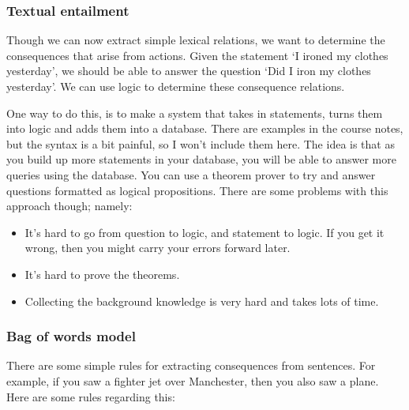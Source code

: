 \subsubsection{Textual entailment}

Though we can now extract simple lexical relations, we want to determine the
consequences that arise from actions. Given the statement `I ironed my clothes
yesterday', we should be able to answer the question `Did I iron my clothes
yesterday'. We can use logic to determine these consequence relations.

One way to do this, is to make a system that takes in statements, turns them
into logic and adds them into a database. There are examples in the course
notes, but the syntax is a bit painful, so I won't include them here. The idea is
that as you build up more statements in your database, you will be able to
answer more queries using the database. You can use a theorem prover to try and
answer questions formatted as logical propositions. There are some problems with
this approach though; namely:

\begin{itemize}
  \item It's hard to go from question to logic, and statement to logic. If you get it 
    wrong, then you might carry your errors forward later.
  \item It's hard to prove the theorems.
  \item Collecting the background knowledge is very hard and takes lots of time.
\end{itemize}

\subsubsection{Bag of words model}

There are some simple rules for extracting consequences from sentences. For
example, if you saw a fighter jet over Manchester, then you also saw a plane.
Here are some rules regarding this:

